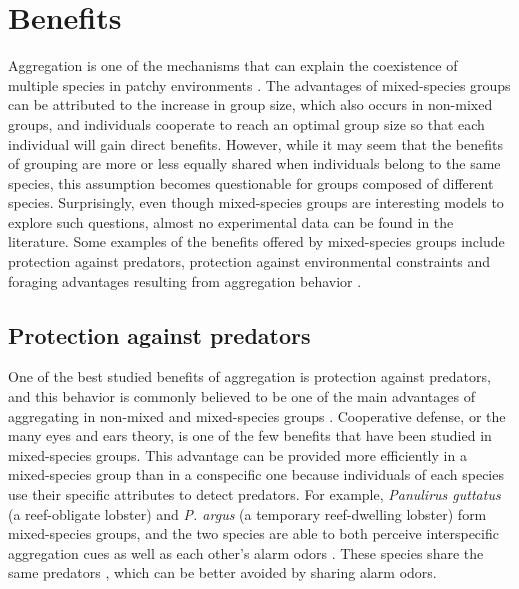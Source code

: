 	\section{Benefits}
Aggregation is one of the mechanisms that can explain the coexistence of multiple species in patchy environments \cite{ives_aggregation_1991}. The advantages of mixed-species groups can be attributed to the increase in group size, which also occurs in non-mixed groups, and individuals cooperate to reach an optimal group size so that each individual will gain direct benefits. However, while it may seem that the benefits of grouping are more or less equally shared when individuals belong to the same species, this assumption becomes questionable for groups composed of different species. Surprisingly, even though mixed-species groups are interesting models to explore such questions, almost no experimental data can be found in the literature. Some examples of the benefits offered by mixed-species groups include protection against predators, protection against environmental constraints and foraging advantages resulting from aggregation behavior \citep{parrish_complexity_1999,riipi_multiple_2001,weed_benefits_2010}. 

		\subsection{Protection against predators}
One of the best studied benefits of aggregation is protection against predators, and this behavior is commonly believed to be one of the main advantages of aggregating in non-mixed and mixed-species groups \citep{evans_insect_1990,vulinec_collective_1990}. 
Cooperative defense, or the many eyes and ears theory, is one of the few benefits that have been studied in mixed-species groups. This advantage can be provided more efficiently in a mixed-species group than in a conspecific one because individuals of each species use their specific attributes to detect predators. For example, \textit{Panulirus guttatus} (a reef-obligate lobster) and \textit{P. argus} (a temporary reef-dwelling lobster) form mixed-species groups, and the two species are able to both perceive interspecific aggregation cues as well as each other’s alarm odors \cite{briones-fourzan_influence_2008}. These species share the same predators \cite{lozano-alvarez_coexistence_2007}, which can be better avoided by sharing alarm odors. 

